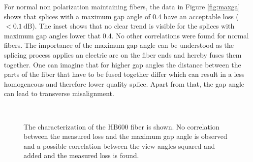 For normal non polarization maintaining fibers, the data in Figure \ref{fig:maxga} shows that splices with a maximum gap angle of 0.4 have an acceptable loss ($< 0.1 \: \mathrm{dB}$). The inset shows that no clear trend is visible for the splices with maximum gap angles lower that 0.4. No other correlations were found for normal fibers. The importance of the maximum gap angle can be understood as the splicing process applies an electric arc on the  fiber ends and hereby fuses them together. One can imagine that for higher gap angles the distance between the parts of the fiber that have to be fused together differ which can result in a less homogeneous and therefore lower quality splice. Apart from that, the gap angle can lead to transverse misalignment.

\begin{figure}\centering
         ~ %
         ~ %
          \caption{The characterization of the HB600 fiber is shown. No correlation between the measured loss and the maximum gap angle is observed and a possible correlation between the view angles squared and added and the measured loss is found.}\label{fig:animals}

\end{figure}


